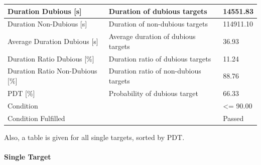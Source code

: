 \begin{center}
\begin{table}[H]
\begin{tabularx}{\textwidth}{ | l | X |  l | }
    Duration Dubious [s] & Duration of dubious targets & 14551.83 \\ \hline
    Duration Non-Dubious [s] & Duration of non-dubious targets & 114911.10 \\ \hline
    Average Duration Dubious [s] & Average duration of dubious targets & 36.93 \\ \hline
    Duration Ratio Dubious [\%] & Duration ratio of dubious targets & 11.24 \\ \hline
    Duration Ratio Non-Dubious [\%] & Duration ratio of non-dubious targets & 88.76 \\ \hline
    PDT [\%] & Probability of dubious target & 66.33 \\ \hline
    Condition &  & <= 90.00 \\ \hline
    Condition Fulfilled &  & Passed \\ \hline
\end{tabularx}
\end{table}
\end{center}

Also, a table is given for all single targets, sorted by PDT.

\paragraph{Single Target}

